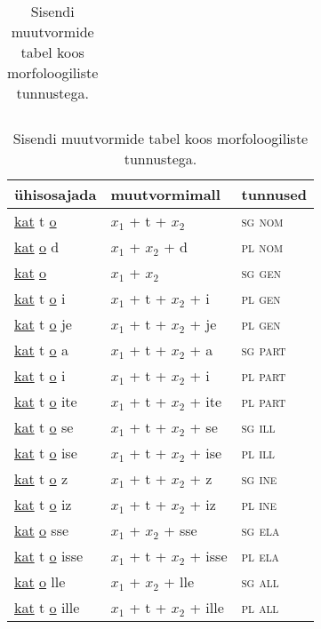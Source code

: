 \documentclass[12pt,a4paper]{article}
\begin{document}
\begin{table}[H]
\begin{minipage}[t]{.40\textwidth}
\begin{tabular}[t]{l l}
    \end{tabular}
    \caption{Sisendi muutvormide tabel koos morfo\-loogiliste tunnustega.}
    \label{tab:sisendtabel_katto}
  \end{minipage}
  \hfill
  \begin{minipage}[t]{.55\textwidth}
    \centering
    \begin{tabular}[t]{l l l}
      ühisosajada                     & muutvormi\-mall           & tunnused \\
      \hline
      \underline{kat} t \underline{o}       & $x_1$ + t + $x_2$         & \textsc{sg nom} \\
      \underline{kat}   \underline{o} d     & $x_1$ + $x_2$ + d         & \textsc{pl nom} \\
      \underline{kat}   \underline{o}       & $x_1$ + $x_2$             & \textsc{sg gen} \\
      \underline{kat} t \underline{o} i     & $x_1$ + t + $x_2$ + i     & \textsc{pl gen} \\
      \underline{kat} t \underline{o} je    & $x_1$ + t + $x_2$ + je    & \textsc{pl gen} \\
      \underline{kat} t \underline{o} a     & $x_1$ + t + $x_2$ + a     & \textsc{sg part} \\
      \underline{kat} t \underline{o} i     & $x_1$ + t + $x_2$ + i     & \textsc{pl part} \\
      \underline{kat} t \underline{o} ite   & $x_1$ + t + $x_2$ + ite   & \textsc{pl part} \\
      \underline{kat} t \underline{o} se    & $x_1$ + t + $x_2$ + se    & \textsc{sg ill} \\
      \underline{kat} t \underline{o} ise   & $x_1$ + t + $x_2$ + ise   & \textsc{pl ill} \\
      \underline{kat} t \underline{o} z     & $x_1$ + t + $x_2$ + z     & \textsc{sg ine} \\
      \underline{kat} t \underline{o} iz    & $x_1$ + t + $x_2$ + iz    & \textsc{pl ine} \\
      \underline{kat}   \underline{o} sse   & $x_1$ + $x_2$ + sse       & \textsc{sg ela} \\
      \underline{kat} t \underline{o} isse  & $x_1$ + t + $x_2$ + isse  & \textsc{pl ela} \\
      \underline{kat}   \underline{o} lle   & $x_1$ + $x_2$ + lle       & \textsc{sg all} \\
      \underline{kat} t \underline{o} ille  & $x_1$ + t + $x_2$ + ille  & \textsc{pl all} \\

\end{tabular}
\end{minipage}
\end{table}
\end{document}
